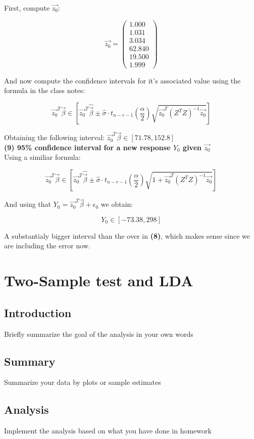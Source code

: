 \documentclass[11pt,a4paper]{article}
\begin{document}
	First, compute $\vec{z_0}$:
	
	$$ \vec{z_0} = 
	\begin{pmatrix}
		1.000  \\
		1.031  \\
		3.034  \\
		62.840 \\
		19.500 \\
		1.999 
	\end{pmatrix} 
	$$
	
	And now compute the confidence intervals for it's associated value using the formula in the class notes:
	
	$$ \vec{z_0}^T \vec{\beta} \in [\vec{z_0}^T \hat{\vec{\beta}} \pm \hat{\sigma} \cdot t_{n-r-1}(\frac{\alpha}{2}) \sqrt{\vec{z_0}^T (Z^T Z)^{-1} \vec{z_0}} ] $$
	
	Obtaining the following interval: $ \vec{z_0}^T \vec{\beta} \in [ 71.78 , 152.8 ] $ \\
	
	\textbf{(9) 95\% confidence interval for a new response $Y_0$ given $\vec{z_0}$} \\
	
	Using a similiar formula: 
	
	$$ \vec{z_0}^T \vec{\beta} \in [\vec{z_0}^T \hat{\vec{\beta}} \pm \hat{\sigma} \cdot t_{n-r-1}(\frac{\alpha}{2}) \sqrt{1 + \vec{z_0}^T (Z^T Z)^{-1} \vec{z_0}} ] $$
	
	And using that $Y_0 = \vec{z_0}^T \vec{\beta} + \epsilon_0$ we obtain:
	
	$$ Y_0 \in [ -73.38 , 298 ] $$
	
	A substantialy bigger interval than the over in \textbf{(8)}, which makes sense since we are including the error now.
	
	\section{Two-Sample test and LDA}
	
	\subsection{Introduction}
	Briefly summarize the goal of the analysis in your own words
	\subsection{Summary}
	Summarize your data by plots or sample estimates
	\subsection{Analysis}
	Implement the analysis based on what you have done in homework
	
\end{document}
